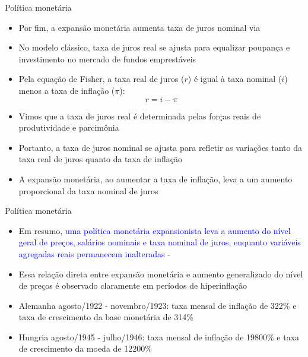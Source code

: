 \documentclass[10pt]{beamer}
\begin{document}
\begin{frame}
    {Política monetária}
    \begin{itemize}
        \item Por fim, a expansão monetária aumenta taxa de juros nominal via \bigskip
        \item No modelo clássico, taxa de juros real se ajusta para equalizar poupança e investimento no mercado de fundos emprestáveis\bigskip
        \item Pela equação de Fisher, a taxa real de juros ($r$) é igual à taxa nominal ($i$) menos a taxa de inflação ($\pi$):
        \begin{equation}
            r = i - \pi
            \label{aula3_eq9}
        \end{equation}
        \item Vimos que a taxa de juros real é determinada pelas forças reais de produtividade e parcimônia\bigskip
        \item Portanto, a taxa de juros nominal se ajusta para refletir as variações tanto da taxa real de juros quanto da taxa de inflação\bigskip
        \item A expansão monetária, ao aumentar a taxa de inflação, leva a um aumento proporcional da taxa nominal de juros
    \end{itemize}
\end{frame}

\begin{frame}
    {Política monetária}
    \begin{itemize}
        \item Em resumo, \textcolor{blue}{uma política monetária expansionista leva a aumento do nível geral de preços, salários nominais e taxa nominal de juros, enquanto variáveis agregadas reais permanecem inalteradas} - \bigskip
        \item Essa relação direta entre expansão monetária e aumento generalizado do nível de preços é observado claramente em períodos de hiperinflação\bigskip
        \item Alemanha agosto/1922 - novembro/1923: taxa mensal de inflação de 322\% e taxa de crescimento da base monetária de 314\%\bigskip
        \item Hungria agosto/1945 - julho/1946: taxa mensal de inflação de 19800\% e taxa de crescimento da moeda de 12200\%
    \end{itemize}
\end{frame}
\end{document}

